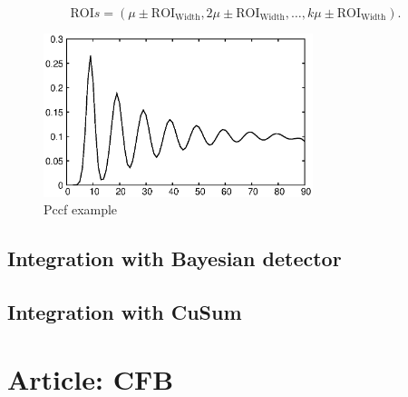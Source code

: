 \documentclass[doctoral,utf8,lot,loar,lof,shortloft,index]{jydiss}
\begin{document}
\begin{equation}\label{eq:rois}
	\text{ROI}s = (\mu \pm \text{ROI}_{\text{Width}}, 2 \mu \pm \text{ROI}_{\text{Width}}, \dots , k \mu \pm \text{ROI}_{\text{Width}}).
\end{equation}
\begin{figure}[!htb]
	\centering
	\includegraphics[width=0.7\textwidth]{images/example_pccf.eps}
	\caption{Pccf example}\label{fig:pccf_example}
\end{figure}



\section{Integration with Bayesian detector}
\section{Integration with CuSum}

\chapter{Article: CFB}
\end{document}
